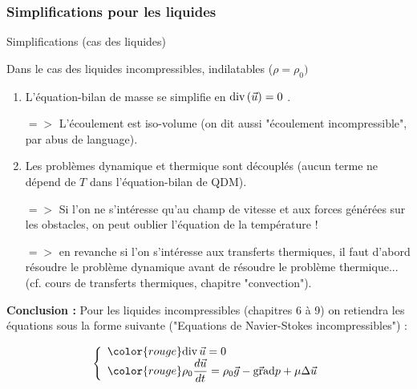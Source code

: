 \subsubsection{Simplifications pour les liquides}
\begin{frame}{Simplifications (cas des liquides)}
\small

Dans le cas des liquides incompressibles, indilatables ($\rho = \rho_0)$

\begin{enumerate} 

\item L'équation-bilan de masse se simplifie en $\mbox{\rm div}\, (\vec{u}) = 0$ .

$=>$ L'écoulement est iso-volume (on dit aussi "écoulement incompressible", par abus de language).

\item Les problèmes dynamique et thermique sont découplés (aucun terme ne dépend de $T$ dans l'équation-bilan de QDM).

$=>$ Si l'on ne s'intéresse qu'au champ de vitesse et aux forces générées sur les obstacles, on peut oublier l'équation de la température !

$=>$ en revanche si l'on s'intéresse aux transferts thermiques, il faut d'abord résoudre le problème dynamique avant de résoudre le problème thermique...
(cf. cours de transferts thermiques, chapitre "convection").

\end{enumerate}

\pause
\medskip

{\bf Conclusion :}  Pour les liquides incompressibles (chapitres 6 à 9) on retiendra les équations sous la forme suivante ("Equations de Navier-Stokes incompressibles") :



\begin{equation*}
\left\{
\begin{array}{l}
\color{rouge} \divergence \myvec{u} = 0
\\
\color{rouge}
\rho_0 \ddt{\myvec{u}} 
= 
\rho_0  \myvec{g}  - \gradient p + \mu  \Delta \myvec{u} 
\end{array}
\right.
\end{equation*}





\end{frame}

